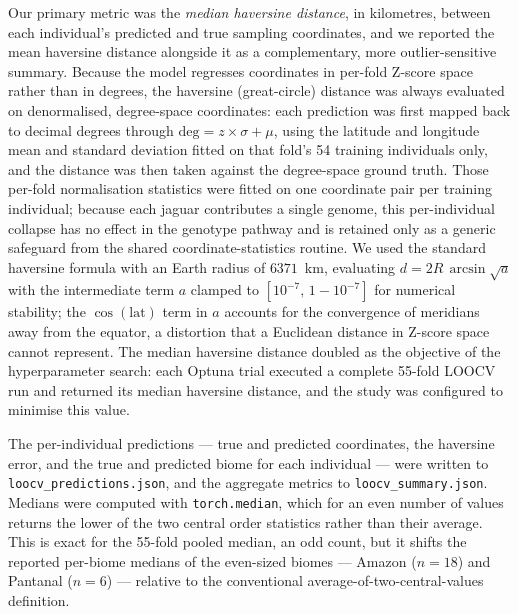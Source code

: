 \documentclass[twocolumn,10pt]{article}
\begin{document}
Our primary metric was the \emph{median haversine distance}, in kilometres, between each
individual's predicted and true sampling coordinates, and we reported the mean haversine distance
alongside it as a complementary, more outlier-sensitive summary. Because the model regresses
coordinates in per-fold Z-score space rather than in degrees, the haversine (great-circle) distance
was always evaluated on denormalised, degree-space coordinates: each prediction was first mapped
back to decimal degrees through $\mathrm{deg} = z \times \sigma + \mu$, using the latitude and
longitude mean and standard deviation fitted on that fold's 54 training individuals only, and the
distance was then taken against the degree-space ground truth. Those per-fold normalisation
statistics were fitted on one coordinate pair per training individual; because each jaguar
contributes a single genome, this per-individual collapse has no effect in the genotype pathway and
is retained only as a generic safeguard from the shared coordinate-statistics routine. We used the
standard haversine formula with an Earth radius of $6371$~km, evaluating $d = 2R\,\arcsin\!\sqrt{a}$
with the intermediate term $a$ clamped to $[10^{-7},\,1-10^{-7}]$ for numerical stability; the
$\cos(\mathrm{lat})$ term in $a$ accounts for the convergence of meridians away from the equator, a
distortion that a Euclidean distance in Z-score space cannot represent. The median haversine
distance doubled as the objective of the hyperparameter search: each Optuna trial executed a
complete 55-fold LOOCV run and returned its median haversine distance, and the study was configured
to minimise this value.

The per-individual predictions --- true and predicted coordinates, the haversine error, and the true
and predicted biome for each individual --- were written to \texttt{loocv\_predictions.json}, and
the aggregate metrics to \texttt{loocv\_summary.json}. Medians were computed with
\texttt{torch.median}, which for an even number of values returns the lower of the two central order
statistics rather than their average. This is exact for the 55-fold pooled median, an odd count, but
it shifts the reported per-biome medians of the even-sized biomes --- Amazon ($n=18$) and Pantanal
($n=6$) --- relative to the conventional average-of-two-central-values definition.
\end{document}
